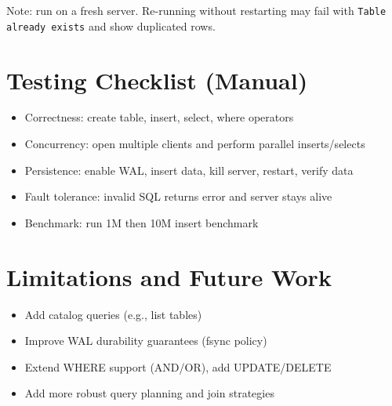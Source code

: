\documentclass[11pt,a4paper]{article}
\begin{document}
Note: run on a fresh server. Re-running without restarting may fail with \texttt{Table already exists} and show duplicated rows.

\section{Testing Checklist (Manual)}
\begin{itemize}
  \item Correctness: create table, insert, select, where operators
  \item Concurrency: open multiple clients and perform parallel inserts/selects
  \item Persistence: enable WAL, insert data, kill server, restart, verify data
  \item Fault tolerance: invalid SQL returns error and server stays alive
  \item Benchmark: run 1M then 10M insert benchmark
\end{itemize}

\section{Limitations and Future Work}
\begin{itemize}
  \item Add catalog queries (e.g., list tables)
  \item Improve WAL durability guarantees (fsync policy)
  \item Extend WHERE support (AND/OR), add UPDATE/DELETE
  \item Add more robust query planning and join strategies
\end{itemize}
\end{document}
